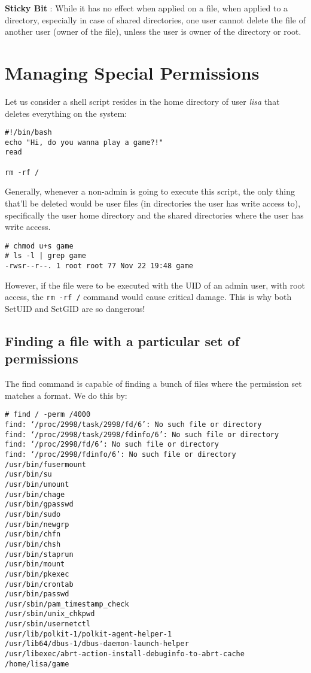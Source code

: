 \noindent
\textbf{Sticky Bit} : While it has no effect when applied on a file, when applied to a directory, especially in case of shared directories, one user cannot delete the file of another user (owner of the file), unless the user is owner of the directory or root. 

	\section{Managing Special Permissions}
Let us consider a shell script resides in the home directory of user \textit{lisa} that deletes everything on the system:

\vspace{-15pt}
\begin{verbatim}
#!/bin/bash
echo "Hi, do you wanna play a game?!"
read

rm -rf /
\end{verbatim}
\vspace{-10pt}

Generally, whenever a non-admin is going to execute this script, the only thing that'll be deleted would be user files (in directories the user has write access to), specifically the user home directory and the shared directories where the user has write access. 

\vspace{-15pt}
\begin{verbatim}
# chmod u+s game
# ls -l | grep game
-rwsr--r--. 1 root root 77 Nov 22 19:48 game
\end{verbatim}
\vspace{-10pt}

However, if the file were to be executed with the UID of an admin user, with root access, the \verb|rm -rf /| command would cause critical damage. This is why both SetUID and SetGID are so dangerous! 

\subsection{Finding a file with a particular set of permissions}
The find command is capable of finding a bunch of files where the permission set matches a format. We do this by:

\vspace{-15pt}
\begin{verbatim}
# find / -perm /4000
find: ‘/proc/2998/task/2998/fd/6’: No such file or directory
find: ‘/proc/2998/task/2998/fdinfo/6’: No such file or directory
find: ‘/proc/2998/fd/6’: No such file or directory
find: ‘/proc/2998/fdinfo/6’: No such file or directory
/usr/bin/fusermount
/usr/bin/su
/usr/bin/umount
/usr/bin/chage
/usr/bin/gpasswd
/usr/bin/sudo
/usr/bin/newgrp
/usr/bin/chfn
/usr/bin/chsh
/usr/bin/staprun
/usr/bin/mount
/usr/bin/pkexec
/usr/bin/crontab
/usr/bin/passwd
/usr/sbin/pam_timestamp_check
/usr/sbin/unix_chkpwd
/usr/sbin/usernetctl
/usr/lib/polkit-1/polkit-agent-helper-1
/usr/lib64/dbus-1/dbus-daemon-launch-helper
/usr/libexec/abrt-action-install-debuginfo-to-abrt-cache
/home/lisa/game
\end{verbatim}
\vspace{-10pt}

